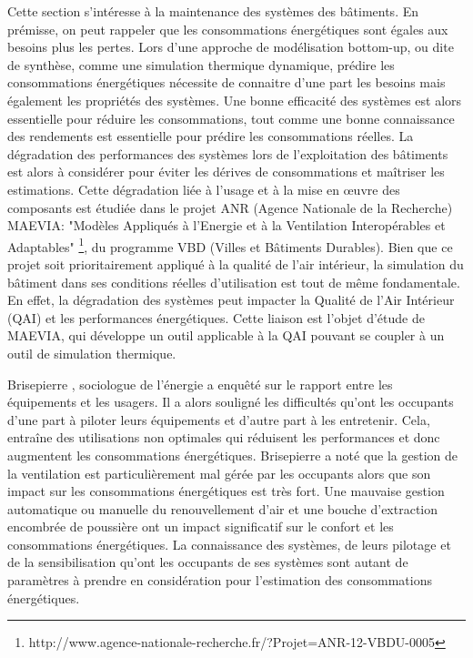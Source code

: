 Cette section s'intéresse à la maintenance des systèmes des bâtiments. En prémisse, on peut rappeler que les consommations énergétiques sont égales aux besoins plus les pertes. Lors d'une approche de modélisation bottom-up, ou dite de synthèse, comme une simulation thermique dynamique, prédire les consommations énergétiques nécessite de connaitre d'une part les besoins mais également les propriétés des systèmes. Une bonne efficacité des systèmes est alors essentielle pour réduire les consommations, tout comme une bonne connaissance des rendements est essentielle pour prédire les consommations réelles. La dégradation des performances des systèmes lors de l'exploitation des bâtiments est alors à considérer pour éviter les dérives de consommations et maîtriser les estimations. Cette dégradation liée à l'usage et à la mise en œuvre des composants est étudiée dans le projet ANR (Agence Nationale de la Recherche) MAEVIA: "Modèles Appliqués à l'Energie et à la Ventilation Interopérables et Adaptables" \footnote{http://www.agence-nationale-recherche.fr/?Projet=ANR-12-VBDU-0005}, du programme VBD (Villes et Bâtiments Durables). Bien que ce projet soit prioritairement appliqué à la qualité de l'air intérieur, la simulation du bâtiment dans ses conditions réelles d'utilisation est tout de même fondamentale. En effet, la dégradation des systèmes peut impacter la Qualité de l'Air Intérieur (QAI) et les performances énergétiques. Cette liaison est l'objet d'étude de MAEVIA, qui développe un outil applicable à la QAI pouvant se coupler à un outil de simulation thermique.

Brisepierre \cite{Brisepierre-11}, sociologue de l'énergie a enquêté sur le rapport entre les équipements et les usagers. Il a alors souligné les difficultés qu'ont les occupants d'une part à piloter leurs équipements et d'autre part à les entretenir. Cela, entraîne des utilisations non optimales qui réduisent les performances et donc augmentent les consommations énergétiques. Brisepierre a noté que la gestion de la ventilation est particulièrement mal gérée par les occupants alors que son impact sur les consommations énergétiques est très fort. Une mauvaise gestion automatique ou manuelle du renouvellement d'air et une bouche d'extraction encombrée de poussière ont un impact significatif sur le confort et les consommations énergétiques. La connaissance des systèmes, de leurs pilotage et de la sensibilisation qu'ont les occupants de ses systèmes sont autant de paramètres à prendre en considération pour l'estimation des consommations énergétiques. 

